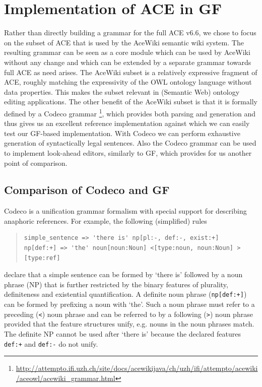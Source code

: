 \documentclass[a4paper]{article}
\begin{document}
\section{Implementation of ACE in GF}
\label{section:ACE_in_GF}

Rather than directly building a grammar for the
full ACE v6.6\cite{ACE_6.6_Construction_Rules}, we chose to focus
on the subset of ACE that is used by the AceWiki semantic wiki system. The
resulting grammar can be seen as a core module which can be used by AceWiki
without any change and which can be extended by a separate grammar
towards full ACE as need arises. The AceWiki subset is a relatively expressive
fragment of ACE, roughly matching the expressivity of the OWL ontology
language
\cite{OWL_2_Web_Ontology_Language_Document_Overview}
without data properties.
This makes the subset relevant in (Semantic Web) ontology editing applications.
The other benefit of the AceWiki subset is that it is formally defined by a
Codeco grammar \cite{kuhn:cnl2010_revised}
\footnote{\url{http://attempto.ifi.uzh.ch/site/docs/acewikijava/ch/uzh/ifi/attempto/acewiki/aceowl/acewiki_grammar.html}},
which provides both parsing and generation and thus gives us an excellent
reference implementation against which we can easily test our GF-based
implementation.
With Codeco we can perform exhaustive generation of syntactically legal
sentences. Also the Codeco grammar can be used to implement look-ahead
editors, similarly to GF, which provides for us another point of comparison.

\subsection{Comparison of Codeco and GF}
\label{subsection:Codeco}

Codeco is a unification grammar formalism with special support for describing
anaphoric references. For example, the following (simplified) rules

\small
\begin{quote}
\begin{verbatim}
simple_sentence => 'there is' np[pl:-, def:-, exist:+]
np[def:+] => 'the' noun[noun:Noun] <[type:noun, noun:Noun] >[type:ref]
\end{verbatim}
\end{quote}
\normalsize

declare that a simple
sentence can be formed by `there is' followed by
a noun phrase (NP) that is further restricted by the binary features of
plurality, definiteness and existential quantification.
A definite noun phrase (\verb!np[def:+]!) can be formed by prefixing
a noun with `the'. Such a noun phrase
must refer to a preceding (\verb!<!) noun phrase and can be referred to by a
following (\verb!>!) noun phrase provided that the feature structures
unify, e.g. nouns in the noun phrases match.
The definite NP cannot be used after `there is' because the
declared features \verb!def:+! and \verb!def:-! do not unify.
\end{document}
